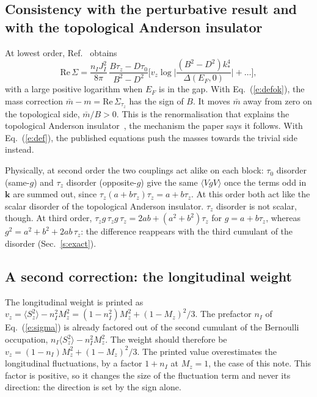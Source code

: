 \documentclass[11pt,a4paper]{article}
\begin{document}
\subsection{Consistency with the perturbative result and with the topological Anderson insulator}

At lowest order, Ref.~\cite{g2g1} obtains
\begin{equation}
\mathrm{Re}\,\Sigma = \frac{n_I J_I^2}{8\pi}\,\frac{B\tau_z-D\tau_0}{B^2-D^2}
\Big[v_z\log\Big|\frac{(B^2-D^2)k_*^4}{\Delta(E_F,0)}\Big| + \dots\Big],
\label{e:reS}
\end{equation}
with a large positive logarithm when $E_F$ is in the gap. With Eq.~(\ref{e:defok}), the mass
correction $\bar m-m=\mathrm{Re}\,\Sigma_{\tau_z}$ has the sign of $B$. It moves $\bar m$ away from
zero on the topological side, $\bar m/B>0$. This is the renormalisation that explains the
topological Anderson insulator~\cite{li2009,groth2009,jiang2009}, the mechanism the paper says it
follows. With Eq.~(\ref{e:def}), the published equations push the masses towards the trivial side
instead.

Physically, at second order the two couplings act alike on each block: $\tau_0$ disorder (same-$g$)
and $\tau_z$ disorder (opposite-$g$) give the same $\langle VgV\rangle$ once the terms odd in $\bm k$ are
summed out, since $\tau_z(a+b\tau_z)\tau_z=a+b\tau_z$. At this order both act like the scalar disorder of
the topological Anderson insulator. $\tau_z$ disorder is not scalar, though. At third order,
$\tau_z g\,\tau_z g\,\tau_z=2ab+(a^2+b^2)\tau_z$ for $g=a+b\tau_z$, whereas $g^2=a^2+b^2+2ab\,\tau_z$: the
difference reappears with the third cumulant of the disorder (Sec.~\ref{s:exact}).

\subsection{A second correction: the longitudinal weight}\label{s:vz}

The longitudinal weight is printed as $v_z = \langle S_z^2\rangle - n_I^2M_z^2 = (1-n_I^2)M_z^2+(1-M_z)^2/3$.
The prefactor $n_I$ of Eq.~(\ref{e:sigma}) is already factored out of the second cumulant of
the Bernoulli occupation, $n_I\langle S_z^2\rangle - n_I^2 M_z^2$. The weight should therefore be
$v_z = (1-n_I)M_z^2 + (1-M_z)^2/3$. The printed value overestimates the longitudinal
fluctuations, by a factor $1+n_I$ at $M_z=1$, the case of this note. This factor is positive, so
it changes the size of the fluctuation term and never its direction: the direction is set by the
sign alone.
\end{document}
